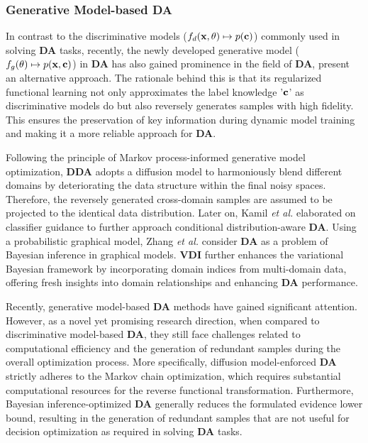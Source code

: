 \subsubsection{Generative Model-based DA}
\label{Generative Model-based DA}


In contrast to the discriminative models (${f_d}({\bf{x}},\theta ) \mapsto p({\bf{c}})$) commonly used in solving \textbf{DA} tasks, recently, the newly developed generative model (${f_g}(\theta ) \mapsto p({\bf{x}},{\bf{c}})$) in \textbf{DA} has also gained prominence in the field of \textbf{DA}, present an alternative approach. The rationale behind this is that its regularized functional learning \cite{lasserre2006principled, DBLP:conf/ijcai/JiangZTTZ17} not only approximates the label knowledge '${\bf{c}}$' as discriminative models do but also reversely generates samples with high fidelity. This ensures the preservation of key information during dynamic model training and making it a more reliable approach for \textbf{DA}. 


Following the principle of Markov process-informed generative model optimization, \textbf{DDA} \cite{gao2023back} adopts a diffusion model to harmoniously blend different domains by deteriorating the data structure within the final noisy spaces. Therefore, the reversely generated cross-domain samples are assumed to be projected to the identical data distribution. Later on, Kamil \textit{et al.} \cite{deja2023learning} elaborated on classifier guidance to further approach conditional distribution-aware \textbf{DA}. Using a probabilistic graphical model, Zhang \textit{et al.} \cite{zhang2020domain} consider \textbf{DA} as a problem of Bayesian inference in graphical models. \textbf{VDI} \cite{xu2023domainindexing} further enhances the variational Bayesian framework by incorporating domain indices from multi-domain data, offering fresh insights into domain relationships and enhancing \textbf{DA} performance.



Recently, generative model-based \textbf{DA} methods have gained significant attention. However, as a novel yet promising research direction, when compared to discriminative model-based \textbf{DA}, they still face challenges related to computational efficiency and the generation of redundant samples during the overall optimization process. More specifically, diffusion model-enforced \textbf{DA} \cite{gao2023back} strictly adheres to the Markov chain optimization, which requires substantial computational resources for the reverse functional transformation. Furthermore, Bayesian inference-optimized \textbf{DA} generally reduces the formulated evidence lower bound, resulting in the generation of redundant samples that are not useful for decision optimization as required in solving \textbf{DA} tasks.



